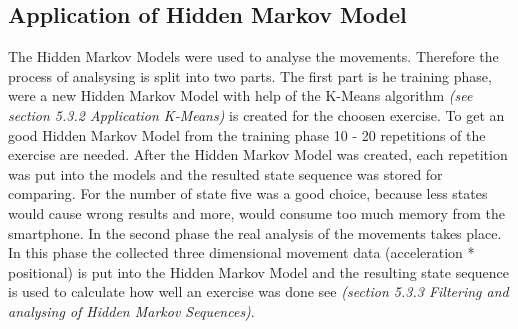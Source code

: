 \subsection{Application of Hidden Markov Model}

The Hidden Markov Models were used to analyse the movements. Therefore the process of analsysing is split into two parts. The first part is he training phase, were a new Hidden Markov Model with help of the K-Means algorithm \textit{\small(see section 5.3.2 Application K-Means)} is created for the choosen exercise. To get an good Hidden Markov Model from the training phase 10 - 20 repetitions of the exercise are needed. After the Hidden Markov Model was created, each repetition was put into the models and the resulted state sequence was stored for comparing. For the number of state five was a good choice, because less states would cause wrong results and more, would consume too much memory from the smartphone. In the second phase the real analysis of the movements takes place. In this phase the collected three dimensional movement data (acceleration * positional) is put into the Hidden Markov Model and the resulting state sequence is used to calculate how well an exercise was done see \textit{\small(section 5.3.3 Filtering and analysing of Hidden Markov Sequences)}.

